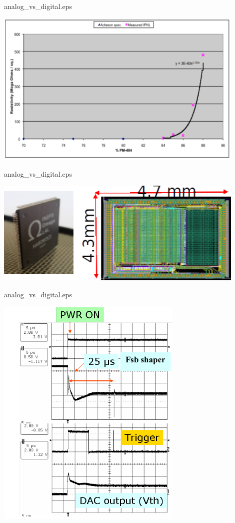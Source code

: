 \documentclass[10pt]{beamer}
\begin{document}
\begin{frame}{analog\_vs\_digital.eps}
    \centerline{\includegraphics[width=0.9\textwidth]{images/CoatingStudies}}
\end{frame}
\begin{frame}{analog\_vs\_digital.eps}
    \centerline{\includegraphics[width=0.9\textwidth]{images/HR2Chip}}
\end{frame}
\begin{frame}{analog\_vs\_digital.eps}
    \centerline{\includegraphics[width=0.9\textheight]{images/PowerPulsingTiming}}
\end{frame}
\end{document}

